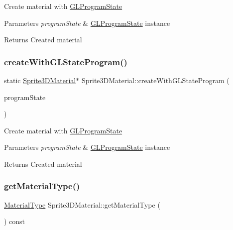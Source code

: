 Create material with \hyperlink{classGLProgramState}{G\+L\+Program\+State} 
\begin{DoxyParams}{Parameters}
{\em program\+State} & \hyperlink{classGLProgramState}{G\+L\+Program\+State} instance \\
\hline
\end{DoxyParams}
\begin{DoxyReturn}{Returns}
Created material 
\end{DoxyReturn}
\mbox{\label{classSprite3DMaterial_afbba69490fc572119f6510cacbb31a11}} 
\subsubsection{\texorpdfstring{create\+With\+G\+L\+State\+Program()}{createWithGLStateProgram()}\hspace{0.1cm}{\footnotesize\ttfamily [2/2]}}
{\footnotesize\ttfamily static \hyperlink{classSprite3DMaterial}{Sprite3\+D\+Material}$\ast$ Sprite3\+D\+Material\+::create\+With\+G\+L\+State\+Program (\begin{DoxyParamCaption}\item[{\hyperlink{classGLProgramState}{G\+L\+Program\+State} $\ast$}]{program\+State }\end{DoxyParamCaption})\hspace{0.3cm}{\ttfamily [static]}}

Create material with \hyperlink{classGLProgramState}{G\+L\+Program\+State} 
\begin{DoxyParams}{Parameters}
{\em program\+State} & \hyperlink{classGLProgramState}{G\+L\+Program\+State} instance \\
\hline
\end{DoxyParams}
\begin{DoxyReturn}{Returns}
Created material 
\end{DoxyReturn}
\mbox{\label{classSprite3DMaterial_a38ed69aaae1203a9161277f511d9b17c}} 
\subsubsection{\texorpdfstring{get\+Material\+Type()}{getMaterialType()}\hspace{0.1cm}{\footnotesize\ttfamily [1/2]}}
{\footnotesize\ttfamily \hyperlink{classSprite3DMaterial_a2b3cb11be78a5f6332cc01d5b7063e32}{Material\+Type} Sprite3\+D\+Material\+::get\+Material\+Type (\begin{DoxyParamCaption}{ }\end{DoxyParamCaption}) const\hspace{0.3cm}{\ttfamily [inline]}}

